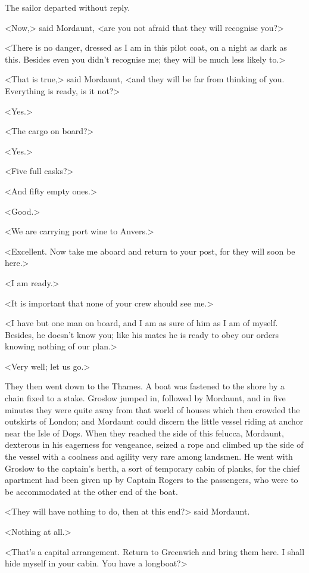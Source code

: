 The sailor departed without reply.

<Now,> said Mordaunt, <are you not afraid that they will recognise you?>

<There is no danger, dressed as I am in this pilot coat, on a night as dark as this. Besides even you didn't recognise me; they will be much less likely to.>

<That is true,> said Mordaunt, <and they will be far from thinking of you. Everything is ready, is it not?>

<Yes.>

<The cargo on board?>

<Yes.>

<Five full casks?>

<And fifty empty ones.>

<Good.>

<We are carrying port wine to Anvers.>

<Excellent. Now take me aboard and return to your post, for they will soon be here.>

<I am ready.>

<It is important that none of your crew should see me.>

<I have but one man on board, and I am as sure of him as I am of myself. Besides, he doesn't know you; like his mates he is ready to obey our orders knowing nothing of our plan.>

<Very well; let us go.>

They then went down to the Thames. A boat was fastened to the shore by a chain fixed to a stake. Groslow jumped in, followed by Mordaunt, and in five minutes they were quite away from that world of houses which then crowded the outskirts of London; and Mordaunt could discern the little vessel riding at anchor near the Isle of Dogs. When they reached the side of this felucca, Mordaunt, dexterous in his eagerness for vengeance, seized a rope and climbed up the side of the vessel with a coolness and agility very rare among landsmen. He went with Groslow to the captain's berth, a sort of temporary cabin of planks, for the chief apartment had been given up by Captain Rogers to the passengers, who were to be accommodated at the other end of the boat.

<They will have nothing to do, then at this end?> said Mordaunt.

<Nothing at all.>

<That's a capital arrangement. Return to Greenwich and bring them here. I shall hide myself in your cabin. You have a longboat?>

